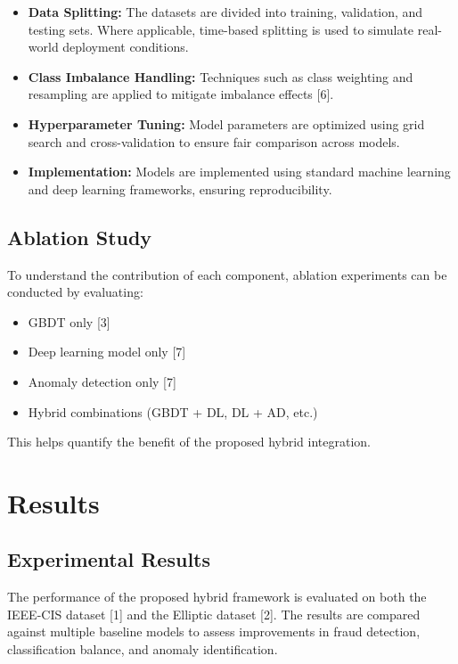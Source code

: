 \documentclass[conference]{IEEEtran}
\begin{document}
\begin{itemize}
    \item \textbf{Data Splitting:}  
    The datasets are divided into training, validation, and testing sets. Where applicable, time-based splitting is used to simulate real-world deployment conditions.

    \item \textbf{Class Imbalance Handling:}  
    Techniques such as class weighting and resampling are applied to mitigate imbalance effects [6].

    \item \textbf{Hyperparameter Tuning:}  
    Model parameters are optimized using grid search and cross-validation to ensure fair comparison across models.

    \item \textbf{Implementation:}  
    Models are implemented using standard machine learning and deep learning frameworks, ensuring reproducibility.
\end{itemize}

\subsection{Ablation Study}

To understand the contribution of each component, ablation experiments can be conducted by evaluating:

\begin{itemize}
    \item GBDT only [3]
    \item Deep learning model only [7]
    \item Anomaly detection only [7]
    \item Hybrid combinations (GBDT + DL, DL + AD, etc.)
\end{itemize}

This helps quantify the benefit of the proposed hybrid integration.


\section{Results}

\subsection{Experimental Results}

The performance of the proposed hybrid framework is evaluated on both the IEEE-CIS dataset [1] and the Elliptic dataset [2]. The results are compared against multiple baseline models to assess improvements in fraud detection, classification balance, and anomaly identification.
\end{document}
